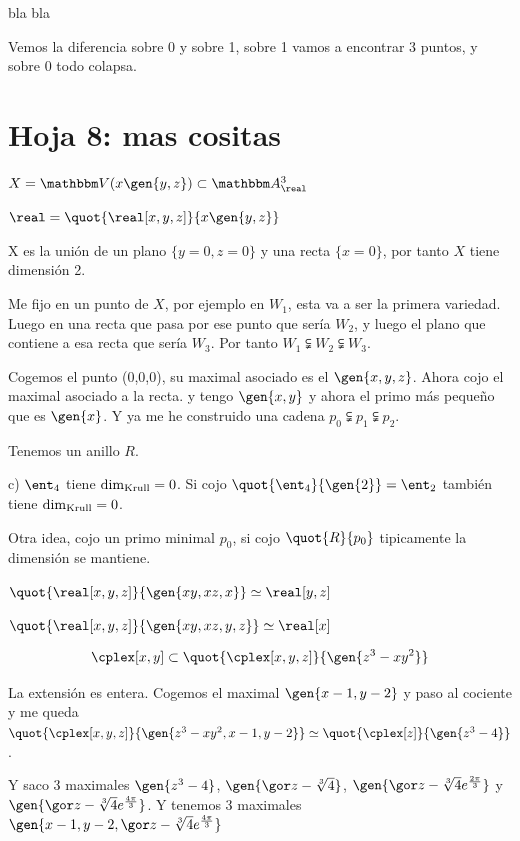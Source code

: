 \begin{problem}[6]
	bla bla
	
	\solution
	
	Vemos la diferencia sobre 0 y sobre 1, sobre 1 vamos a encontrar 3 puntos, y sobre 0 todo colapsa.
\end{problem}


\section{Hoja 8: mas cositas}

\begin{problem}[4]
	$X= \V(x \gen{y,z}) \subset \A^3_{\real}$ 
	
	$\real= \quot{\real[x,y,z]}{x\gen{y,z}}$
	\solution
	
	X es la unión de un plano $\{ y=0, z=0 \}$ y una recta $\{ x=0 \}$, por tanto $X$ tiene dimensión 2.
	
	Me fijo en un punto de $X$, por ejemplo en $W_1$, esta va a ser la primera variedad. Luego en una recta que pasa por ese punto que sería $W_2$, y luego el plano que contiene a esa recta que sería $W_3$. Por tanto $W_1 \subsetneqq W_2 \subsetneqq W_3$.
	
	Cogemos el punto (0,0,0), su maximal asociado es el $\gen{x,y,z}$. Ahora cojo el maximal asociado a la recta. y tengo $\gen{x,y}$ y ahora el primo más pequeño que es $\gen{x}$. Y ya me he construido una cadena $p_0 \subsetneqq p_1 \subsetneqq p_2$.
\end{problem}

\begin{problem}[3]
	Tenemos un anillo $R$.
	
	\solution
	
	c) $\ent_4$ tiene $\dim_{\mathrm{Krull}}=0$. Si cojo $\quot{\ent_4}{\gen{2}}=\ent_2$ también tiene $\dim_{\mathrm{Krull}} = 0$.
	
	Otra idea, cojo un primo minimal $p_0$, si cojo $\quot{R}{p_0}$ tipicamente la dimensión se mantiene.
	
	$\quot{\real[x,y,z]}{\gen{xy,xz,x}} \simeq \real[y,z]$
	
	$\quot{\real[x,y,z]}{\gen{xy,xz,y,z}} \simeq \real[x]$
\end{problem}

\begin{problem}[6]
	
	$$ \cplex[x,y] \subset \quot{\cplex[x,y,z]}{\gen{z^3-xy^2}} $$
	
	
	\solution
	
	La extensión es entera. Cogemos el maximal $\gen{x-1, y-2}$ y paso al cociente y me queda $\quot{\cplex[x,y,z]}{\gen{z^3-xy^2, x-1, y-2}} \simeq \quot{\cplex[z]}{\gen{z^3-4}}$.
	
	Y saco 3 maximales $\gen{z^3-4}$, $\gen{\cls{z}-\sqrt[3]{4}}$, $\gen{\cls{z}-\sqrt[3]{4}e^{\frac{2 \pi}{3}}}$ y $\gen{\cls{z}-\sqrt[3]{4}e^{\frac{4 \pi}{3}}}$. Y tenemos 3 maximales $\gen{x-1, y-2, \cls{z}-\sqrt[3]{4}e^{\frac{4 \pi}{3}}}$
				
				
\end{problem}
